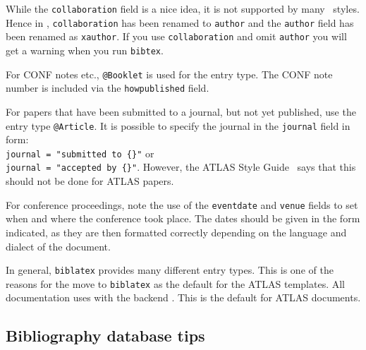 \documentclass[REPORT=false, UKenglish]{atlasdoc}
\begin{document}
While the \texttt{collaboration} field is a nice idea, it is not supported by many \BibTeX\ styles.
Hence in , \texttt{collaboration} has been renamed to \texttt{author} and
the \texttt{author} field has been renamed as \texttt{xauthor}. If you use \texttt{collaboration} and omit
\texttt{author} you will get a warning when you run \texttt{bibtex}.

For CONF notes etc., \texttt{@Booklet} is used for the entry type.
The CONF note number is included via the \texttt{howpublished} field.

For papers that have been submitted to a journal, but not yet published, use the entry type \texttt{@Article}.
It is possible to specify the journal in the \texttt{journal} field in form:\\
\texttt{journal = "submitted to \{\}"} or\\
\texttt{journal = "accepted by \{\}"}.
However, the ATLAS Style Guide~\cite{atlas-style} says that this should not be done for ATLAS papers.

For conference proceedings, note the use of the \texttt{eventdate} and \texttt{venue}
fields to set when and where the conference took place.
The dates should be given in the form indicated,
as they are then formatted correctly depending on the language and dialect of the document.

In general, \texttt{biblatex} provides many different entry types.
This is one of the reasons for the  move to \texttt{biblatex} as the default for the ATLAS templates.
All  documentation uses  with the backend .
 This is the default for ATLAS documents.


\subsection{Bibliography database tips}
\end{document}
